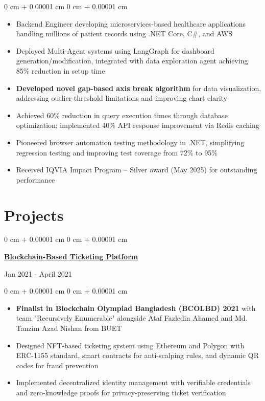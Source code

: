 \documentclass[10pt, letterpaper]{article}
\newenvironment{highlights}{
    \begin{itemize}[
        topsep=0.10 cm,
        parsep=0.10 cm,
        partopsep=0pt,
        itemsep=0pt,
        leftmargin=0 cm + 10pt
    ]
}{
    \end{itemize}
} %
\newenvironment{onecolentry}{
    \begin{adjustwidth}{
        0 cm + 0.00001 cm
    }{
        0 cm + 0.00001 cm
    }
}{
    \end{adjustwidth}
} %
\newenvironment{twocolentry}[2][]{
    \onecolentry
    \def\secondColumn{#2}
    \setcolumnwidth{\fill, 4.5 cm}
    \begin{paracol}{2}
}{
    \switchcolumn \raggedleft \secondColumn
    \end{paracol}
    \endonecolentry
} %
\begin{document}
        \vspace{0.10 cm}
        \begin{onecolentry}
            \begin{highlights}
                \item Backend Engineer developing microservices-based healthcare applications handling millions of patient records using .NET Core, C\#, and AWS
                \item Deployed Multi-Agent systems using LangGraph for dashboard generation/modification, integrated with data exploration agent achieving 85\% reduction in setup time
                \item \textbf{Developed novel gap-based axis break algorithm} for data visualization, addressing outlier-threshold limitations and improving chart clarity
                \item Achieved 60\% reduction in query execution times through database optimization; implemented 40\% API response improvement via Redis caching
                \item Pioneered browser automation testing methodology in .NET, simplifying regression testing and improving test coverage from 72\% to 95\%
                \item Received IQVIA Impact Program – Silver award (May 2025) for outstanding performance
            \end{highlights}
        \end{onecolentry}

        \vspace{0.2 cm}


\section{Projects}
               \begin{twocolentry}{
            {Jan 2021 - April 2021}
        }
            \href{https://tanzimhromel.com/showcase/projects/blockchain-ticketing/}{\textbf{Blockchain-Based Ticketing Platform}}
        \end{twocolentry}
        \begin{onecolentry}
            \begin{highlights}
                
                    \item \textbf{Finalist in Blockchain Olympiad Bangladesh (BCOLBD) 2021} with team "Recursively Enumerable" alongside Ataf Fazledin Ahamed and Md. Tanzim Azad Nishan from BUET
	            \item Designed NFT-based ticketing system using Ethereum and Polygon with ERC-1155 standard, smart contracts for anti-scalping rules, and dynamic QR codes for fraud prevention
                    \item Implemented decentralized identity management with verifiable credentials and zero-knowledge proofs for privacy-preserving ticket verification
                \end{highlights}
                
        \end{onecolentry}
\end{document}
